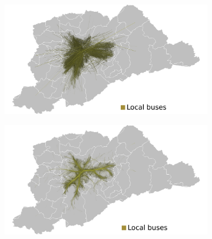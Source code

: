 \begin{figure}[!htb]
  \raggedright\noindent\hspace{-.02\textwidth}%
  \begin{subfigure}{0.55\textwidth}
    \centering
    \includegraphics[width=1\textwidth]{../figuras/busesLocalXmetropolitan/unbundled-buses.png}
    \caption{\label{fig:bus-integration-a}}
  \end{subfigure}\nobreak%
  \hspace{-.06\textwidth}\nobreak%
  \begin{subfigure}{0.55\textwidth}
    \centering
    \includegraphics[width=1\textwidth]{../figuras/busesLocalXmetropolitan/bundled-buses-length.png}
    \caption{\label{fig:bus-integration-b}}
  \end{subfigure}


\end{figure}
